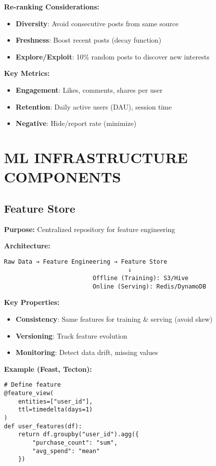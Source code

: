 \documentclass[8pt,landscape]{article}
\begin{document}
\begin{multicols}{3}
\textbf{Re-ranking Considerations:}
\begin{itemize}
\item \textbf{Diversity}: Avoid consecutive posts from same source
\item \textbf{Freshness}: Boost recent posts (decay function)
\item \textbf{Explore/Exploit}: 10\% random posts to discover new interests
\end{itemize}

\textbf{Key Metrics:}
\begin{itemize}
\item \textbf{Engagement}: Likes, comments, shares per user
\item \textbf{Retention}: Daily active users (DAU), session time
\item \textbf{Negative}: Hide/report rate (minimize)
\end{itemize}

\section*{ML INFRASTRUCTURE COMPONENTS}

\subsection*{Feature Store}
\textbf{Purpose:} Centralized repository for feature engineering

\textbf{Architecture:}
\begin{verbatim}
Raw Data → Feature Engineering → Feature Store
                                   ↓
                         Offline (Training): S3/Hive
                         Online (Serving): Redis/DynamoDB
\end{verbatim}

\textbf{Key Properties:}
\begin{itemize}
\item \textbf{Consistency}: Same features for training \& serving (avoid skew)
\item \textbf{Versioning}: Track feature evolution
\item \textbf{Monitoring}: Detect data drift, missing values
\end{itemize}

\textbf{Example (Feast, Tecton):}
\begin{verbatim}
# Define feature
@feature_view(
    entities=["user_id"],
    ttl=timedelta(days=1)
)
def user_features(df):
    return df.groupby("user_id").agg({
        "purchase_count": "sum",
        "avg_spend": "mean"
    })


\end{verbatim}
\end{multicols}
\end{document}
